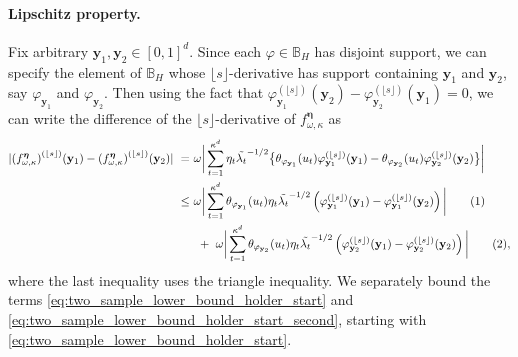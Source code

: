 \documentclass[twoside,11pt]{article}
\newcommand\numberthis{\addtocounter{equation}{1}\tag{\theequation}}
\newcommand{\floor}[1]{\lfloor #1 \rfloor} %
\newcommand{\vectorize}[1]{\mathbf{#1}}
\newcommand{\dimDensity}{d} %
\newcommand{\ONset}{\mathbb{B}}
\newcommand{\binNum}{\kappa}           %
\newcommand{\coef}{\theta}
\newcommand{\domainTs}{
	[0,1]^{{\dimDensity}}
}
\begin{document}
\begin{appendix}
	\paragraph{Lipschitz property.}
	Fix arbitrary $\vectorize{y}_1, \vectorize{y}_2 \in \domainTs$.
	Since each $\varphi \in \ONset_{H}$ has disjoint support,
	we can specify the element of $\ONset_{H}$ whose $\floor{s}$-derivative has support containing  $\vectorize{y}_1$ and  $\vectorize{y}_2$,
	say  $\varphi_{\vectorize{y}_1}$ and  $\varphi_{\vectorize{y}_2}$.
	Then 
	using the fact that
	$\varphi_{\vectorize{y}_1}^{(\floor{s})}(\vectorize{y}_2) 
	-
	\varphi_{\vectorize{y}_2}^{(\floor{s})}(\vectorize{y}_1) = 0$,
	we can write the difference of the $\floor{s}$-derivative of $f^{{\boldsymbol{\eta}}}_{\omega, \binNum}$ as
	\begin{align*}
		|
		{(f^{{\boldsymbol{\eta}}}_{\omega, \binNum})}^{ (\floor{s})}(\vectorize{y}_1)
		-
		{(f^{{\boldsymbol{\eta}}}_{\omega, \binNum})}^{ (\floor{s})}(\vectorize{y}_2)
		|
		~=~& %
		\omega
		\bigg|
		\sum_{t=1}^{\binNum^{\dimDensity}}
		\eta_t
		\tilde{\lambda_t}^{-1/2}
		\bigl\{
		\coef_{\varphi_{\vectorize{y}_1}}(u_t)
		\varphi_{\vectorize{y}_1}^{(\floor{s})}(\vectorize{y}_1)
		-
		\coef_{\varphi_{\vectorize{y}_2}}(u_t)
		\varphi_{\vectorize{y}_2}^{(\floor{s})}(\vectorize{y}_2)
		\bigr\}
		\bigg|
		\\
		~\leq~& %
		\omega
		\bigg|
		\sum_{t=1}^{\binNum^{\dimDensity}}
		\coef_{\varphi_{\vectorize{y}_1}}(u_t)
		\eta_t
		\tilde{\lambda_t}^{-1/2}
		\left(
		\varphi^{(\floor{s})}_{\vectorize{y}_1}(\vectorize{y}_1)
		-
		\varphi^{(\floor{s})}_{\vectorize{y}_1}(\vectorize{y}_2)
		\right)
		\bigg|
		\numberthis \label{eq:two_sample_lower_bound_holder_start}
		\\
		&~+~
		\omega
		\bigg|
		\sum_{t=1}^{\binNum^{\dimDensity}}
		\coef_{\varphi_{\vectorize{y}_2}}(u_t)
		\eta_t
		\tilde{\lambda_t}^{-1/2}
		\left(
		\varphi^{(\floor{s})}_{\vectorize{y}_2}(\vectorize{y}_1)
		-
		\varphi^{(\floor{s})}_{\vectorize{y}_2}(\vectorize{y}_2)
		\right)
		\bigg|
		\numberthis \label{eq:two_sample_lower_bound_holder_start_second},
	\end{align*}
	where the last inequality uses the triangle inequality.
	We separately bound the terms \eqref{eq:two_sample_lower_bound_holder_start} and \eqref{eq:two_sample_lower_bound_holder_start_second}, starting with
	\eqref{eq:two_sample_lower_bound_holder_start}.

\end{appendix}
\end{document}
